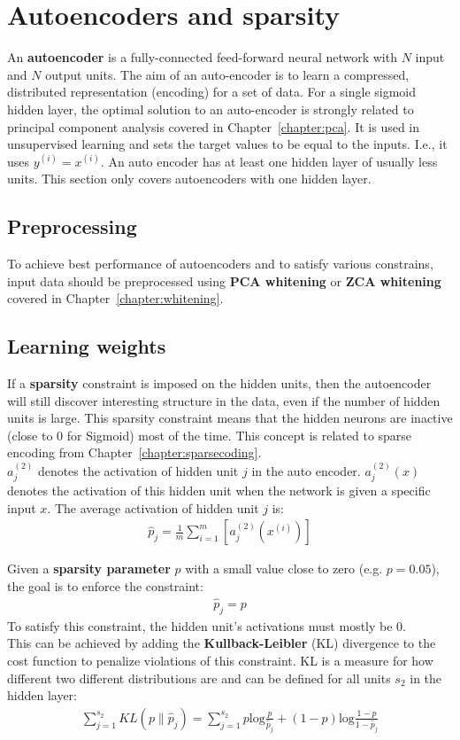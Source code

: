 \documentclass{report}
\begin{document}
\section{Autoencoders and sparsity}
\label{chapter:autoencoders}
An {\bf autoencoder} is a fully-connected feed-forward neural network with $N$ input and $N$ output units.
The aim of an auto-encoder is to learn a compressed, distributed representation (encoding) for a set of data.
For a single sigmoid hidden layer, the optimal solution to an auto-encoder is strongly related to principal component analysis covered in Chapter~\ref{chapter:pca}.
It is used in unsupervised learning and sets the target values to be equal to the inputs. I.e., it uses $y^{(i)} = x^{(i)}$.
An auto encoder has at least one hidden layer of usually less units. This section only covers autoencoders with one hidden layer.

\subsection{Preprocessing}
To achieve best performance of autoencoders and to satisfy various constrains, input data should be preprocessed using {\bf PCA whitening} or {\bf ZCA whitening} covered in Chapter~\ref{chapter:whitening}.

\subsection{Learning weights}
If a {\bf sparsity} constraint is imposed on the hidden units, then the autoencoder will still discover interesting structure in the data, even if the number of hidden units is large.
This sparsity constraint means that the hidden neurons are inactive (close to $0$ for Sigmoid) most of the time.
This concept is related to sparse encoding from Chapter~\ref{chapter:sparsecoding}.
\\
$a_j^{(2)}$ denotes the activation of hidden unit $j$ in the auto encoder.
$a_j^{(2)}(x)$ denotes the activation of this hidden unit when the network is given a specific input $x$.
The average activation of hidden unit $j$ is:
\begin{align*}
\hat{p}_j = \frac{1}{m}\sum_{i=1}^m [a_j^{(2)}(x^{(i)})]
\end{align*}

Given a {\bf sparsity parameter} $p$ with a small value close to zero (e.g. $p=0.05$), the goal is to enforce the constraint:
\begin{align*}
\hat{p}_j = p
\end{align*}
To satisfy this constraint, the hidden unit's activations must mostly be 0.
\\
This can be achieved by adding the {\bf Kullback-Leibler} (KL) divergence to the cost function to penalize violations of this constraint.
KL is a measure for how different two different distributions are and can be defined for all units $s_2$ in the hidden layer:
\begin{align*}
\sum_{j=1}^{s_2} KL(p\rVert \hat{p}_j) = \sum_{j=1}^{s_2}  p\mbox{log}\frac{p}{\hat{p}_j} + (1-p)\mbox{log}\frac{1-p}{1-\hat{p}_j}
\end{align*}
\end{document}
